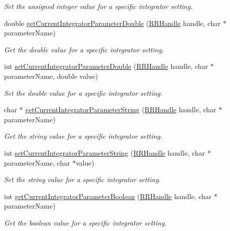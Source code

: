 \begin{DoxyCompactItemize}
\begin{DoxyCompactList}\small\item\em Set the unsigned integer value for a specific integrator setting. \end{DoxyCompactList}\item 
double \hyperlink{group__simopts_gad859b0cb1724ab3aeee81230c2da272a}{get\+Current\+Integrator\+Parameter\+Double} (\hyperlink{rrc__types_8h_a1d68f0592372208fa5a5f2799ea4b3ae}{R\+R\+Handle} handle, char $\ast$parameter\+Name)
\begin{DoxyCompactList}\small\item\em Get the double value for a specific integrator setting. \end{DoxyCompactList}\item 
int \hyperlink{group__simopts_ga90d69322c437f56d551c14445b57bb5a}{set\+Current\+Integrator\+Parameter\+Double} (\hyperlink{rrc__types_8h_a1d68f0592372208fa5a5f2799ea4b3ae}{R\+R\+Handle} handle, char $\ast$parameter\+Name, double value)
\begin{DoxyCompactList}\small\item\em Set the double value for a specific integrator setting. \end{DoxyCompactList}\item 
char $\ast$ \hyperlink{group__simopts_ga11536f253e0b43f8a282bf3bdfaf1328}{get\+Current\+Integrator\+Parameter\+String} (\hyperlink{rrc__types_8h_a1d68f0592372208fa5a5f2799ea4b3ae}{R\+R\+Handle} handle, char $\ast$parameter\+Name)
\begin{DoxyCompactList}\small\item\em Get the string value for a specific integrator setting. \end{DoxyCompactList}\item 
int \hyperlink{group__simopts_ga7b901ff654788259368fc15c01fe53a6}{set\+Current\+Integrator\+Parameter\+String} (\hyperlink{rrc__types_8h_a1d68f0592372208fa5a5f2799ea4b3ae}{R\+R\+Handle} handle, char $\ast$parameter\+Name, char $\ast$value)
\begin{DoxyCompactList}\small\item\em Set the string value for a specific integrator setting. \end{DoxyCompactList}\item 
int \hyperlink{group__simopts_gab06f6ef3c9c6b57a2806132b1906a52e}{get\+Current\+Integrator\+Parameter\+Boolean} (\hyperlink{rrc__types_8h_a1d68f0592372208fa5a5f2799ea4b3ae}{R\+R\+Handle} handle, char $\ast$parameter\+Name)
\begin{DoxyCompactList}\small\item\em Get the boolean value for a specific integrator setting. \end{DoxyCompactList}\item 

\end{DoxyCompactItemize}
